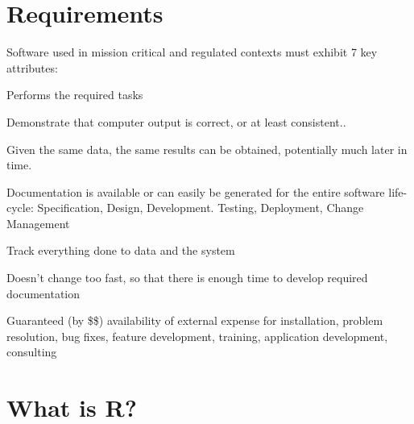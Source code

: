 \documentclass{asaproc}
\begin{document}
\section{Requirements}

  Software used in mission critical and regulated contexts must
  exhibit 7 key attributes:

\begin{description}

\item Performs the required tasks

\item Demonstrate that computer output is correct, or at least consistent..

\item Given the same data, the same results can be
  obtained, potentially much later in time.

\item Documentation is available or can easily be
  generated for the entire software life-cycle: Specification, Design,
  Development. Testing, Deployment, Change Management

\item Track everything done to data and the system

\item Doesn't change too fast, so that there is enough time to
  develop required documentation
  
\item Guaranteed (by \$\$) availability of external expense
  for installation, problem resolution, bug fixes, feature
  development, training, application development, consulting

\end{description}

\section{What is \textsc{R}?}
\end{document}

